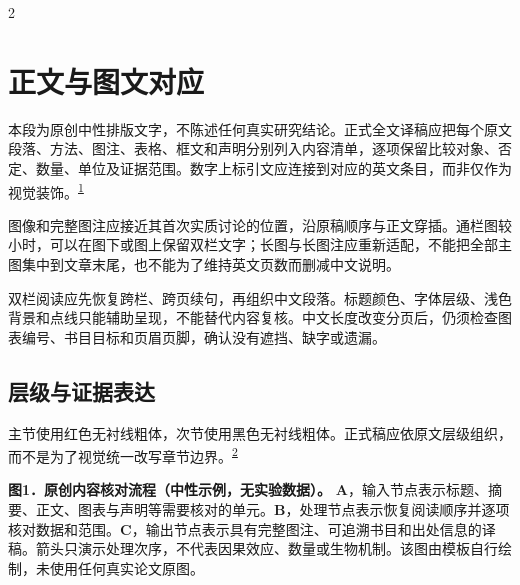 \documentclass[UTF8,fontset=none,scheme=plain]{ctexart}
\newcommand{\EHJCite}[1]{\textsuperscript{\hyperlink{ref:#1}{#1}}}
\newcommand{\EHJBody}{%
本段为原创中性排版文字，不陈述任何真实研究结论。正式全文译稿应把每个原文段落、方法、图注、表格、框文和声明分别列入内容清单，逐项保留比较对象、否定、数量、单位及证据范围。数字上标引文应连接到对应的英文条目，而非仅作为视觉装饰。\EHJCite{1}

图像和完整图注应接近其首次实质讨论的位置，沿原稿顺序与正文穿插。通栏图较小时，可以在图下或图上保留双栏文字；长图与长图注应重新适配，不能把全部主图集中到文章末尾，也不能为了维持英文页数而删减中文说明。

双栏阅读应先恢复跨栏、跨页续句，再组织中文段落。标题颜色、字体层级、浅色背景和点线只能辅助呈现，不能替代内容复核。中文长度改变分页后，仍须检查图表编号、书目目标和页眉页脚，确认没有遮挡、缺字或遗漏。}
\begin{document}
\clearpage
\begin{multicols}{2}
\section*{正文与图文对应}
\EHJBody
\subsection*{层级与证据表达}
主节使用红色无衬线粗体，次节使用黑色无衬线粗体。正式稿应依原文层级组织，而不是为了视觉统一改写章节边界。\EHJCite{2}
\end{multicols}\vspace{5bp}
\noindent\begin{minipage}{\textwidth}
\begin{center}\begin{minipage}{.61\textwidth}\DemoVector\end{minipage}\end{center}
{\fontsize{8bp}{10.8bp}\selectfont\textbf{\color{EHJRed}图1．}\textbf{原创内容核对流程（中性示例，无实验数据）。}
\textbf{A}，输入节点表示标题、摘要、正文、图表与声明等需要核对的单元。\textbf{B}，处理节点表示恢复阅读顺序并逐项核对数据和范围。\textbf{C}，输出节点表示具有完整图注、可追溯书目和出处信息的译稿。箭头只演示处理次序，不代表因果效应、数量或生物机制。该图由模板自行绘制，未使用任何真实论文原图。}\par
\end{minipage}\vspace{8bp}
\end{document}
